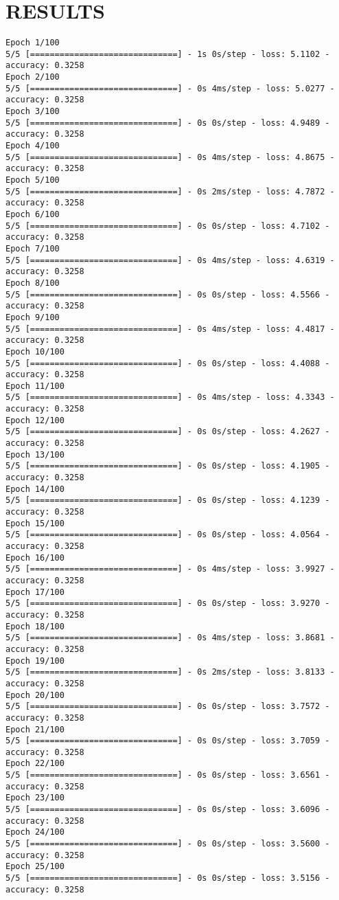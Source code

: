 \documentclass[12pt]{article}
\begin{document}
\section{RESULTS}
\begin{lstlisting}
Epoch 1/100
5/5 [==============================] - 1s 0s/step - loss: 5.1102 - accuracy: 0.3258
Epoch 2/100
5/5 [==============================] - 0s 4ms/step - loss: 5.0277 - accuracy: 0.3258
Epoch 3/100
5/5 [==============================] - 0s 0s/step - loss: 4.9489 - accuracy: 0.3258
Epoch 4/100
5/5 [==============================] - 0s 4ms/step - loss: 4.8675 - accuracy: 0.3258
Epoch 5/100
5/5 [==============================] - 0s 2ms/step - loss: 4.7872 - accuracy: 0.3258
Epoch 6/100
5/5 [==============================] - 0s 0s/step - loss: 4.7102 - accuracy: 0.3258
Epoch 7/100
5/5 [==============================] - 0s 4ms/step - loss: 4.6319 - accuracy: 0.3258
Epoch 8/100
5/5 [==============================] - 0s 0s/step - loss: 4.5566 - accuracy: 0.3258
Epoch 9/100
5/5 [==============================] - 0s 4ms/step - loss: 4.4817 - accuracy: 0.3258
Epoch 10/100
5/5 [==============================] - 0s 0s/step - loss: 4.4088 - accuracy: 0.3258
Epoch 11/100
5/5 [==============================] - 0s 4ms/step - loss: 4.3343 - accuracy: 0.3258
Epoch 12/100
5/5 [==============================] - 0s 0s/step - loss: 4.2627 - accuracy: 0.3258
Epoch 13/100
5/5 [==============================] - 0s 0s/step - loss: 4.1905 - accuracy: 0.3258
Epoch 14/100
5/5 [==============================] - 0s 0s/step - loss: 4.1239 - accuracy: 0.3258
Epoch 15/100
5/5 [==============================] - 0s 0s/step - loss: 4.0564 - accuracy: 0.3258
Epoch 16/100
5/5 [==============================] - 0s 4ms/step - loss: 3.9927 - accuracy: 0.3258
Epoch 17/100
5/5 [==============================] - 0s 0s/step - loss: 3.9270 - accuracy: 0.3258
Epoch 18/100
5/5 [==============================] - 0s 4ms/step - loss: 3.8681 - accuracy: 0.3258
Epoch 19/100
5/5 [==============================] - 0s 2ms/step - loss: 3.8133 - accuracy: 0.3258
Epoch 20/100
5/5 [==============================] - 0s 0s/step - loss: 3.7572 - accuracy: 0.3258
Epoch 21/100
5/5 [==============================] - 0s 0s/step - loss: 3.7059 - accuracy: 0.3258
Epoch 22/100
5/5 [==============================] - 0s 0s/step - loss: 3.6561 - accuracy: 0.3258
Epoch 23/100
5/5 [==============================] - 0s 0s/step - loss: 3.6096 - accuracy: 0.3258
Epoch 24/100
5/5 [==============================] - 0s 0s/step - loss: 3.5600 - accuracy: 0.3258
Epoch 25/100
5/5 [==============================] - 0s 0s/step - loss: 3.5156 - accuracy: 0.3258

\end{lstlisting}
\end{document}
